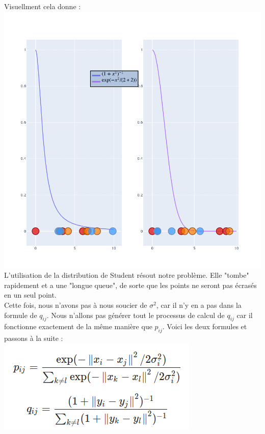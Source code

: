 Visuellment cela donne : 
\\
\includegraphics[width=\linewidth]{./img/reduction_dim/t_sne/graph.png}
\\
L'utilisation de la distribution de Student résout notre problème. Elle "tombe" rapidement et a une "longue queue", de sorte que les points ne seront pas écrasés en un seul point.
\\
Cette fois, nous n'avons pas à nous soucier de $\sigma^2$, car il n'y en a pas dans la formule de $q_{ij}$. Nous n'allons pas générer tout le processus de calcul de $q_{ij}$ car il fonctionne exactement de la même manière que $p_{ij}$. Voici les deux formules et passons à la suite :
\\
\includegraphics[width=\linewidth]{./img/reduction_dim/t_sne/eq_red_dim_3.png}
            





